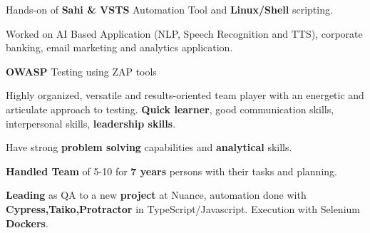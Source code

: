 \begin{cventries}
\begin{cvitemize}
 \item {Hands-on of \textbf{Sahi \& VSTS} Automation Tool and \textbf{Linux/Shell} scripting.}

 \item {Worked on AI Based Application (NLP, Speech Recognition and TTS), corporate banking, email marketing and analytics application.}

 \item {\textbf{OWASP} Testing using ZAP tools}

 \item {Highly organized, versatile and results-oriented team player with an energetic and articulate approach to testing. \textbf{Quick learner}, good communication skills, interpersonal skills, \textbf{leadership skills}.}

 \item {Have strong \textbf{problem solving} capabilities and \textbf{analytical} skills.}

 \item {\textbf{Handled Team} of 5-10 for \textbf{7 years} persons with their tasks and planning.}
 
 \item {\textbf{Leading} as QA to a new \textbf{project} at Nuance, automation done with \textbf{Cypress,Taiko,Protractor} in TypeScript/Javascript. Execution with Selenium \textbf{Dockers}.}
\end{cvitemize}
\end{cventries}
